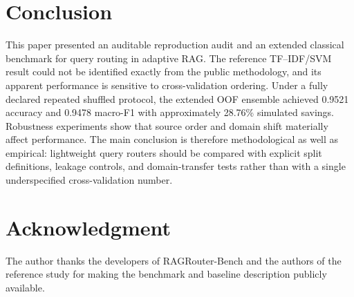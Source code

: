 \documentclass[conference]{IEEEtran}
\begin{document}
\section{Conclusion}
This paper presented an auditable reproduction audit and an extended classical benchmark for query routing in adaptive RAG. The reference TF--IDF/SVM result could not be identified exactly from the public methodology, and its apparent performance is sensitive to cross-validation ordering. Under a fully declared repeated shuffled protocol, the extended OOF ensemble achieved 0.9521 accuracy and 0.9478 macro-F1 with approximately 28.76\% simulated savings. Robustness experiments show that source order and domain shift materially affect performance. The main conclusion is therefore methodological as well as empirical: lightweight query routers should be compared with explicit split definitions, leakage controls, and domain-transfer tests rather than with a single underspecified cross-validation number.

\section*{Acknowledgment}
The author thanks the developers of RAGRouter-Bench and the authors of the reference study for making the benchmark and baseline description publicly available.

\enlargethispage{3\baselineskip}
{\footnotesize


}
\end{document}
